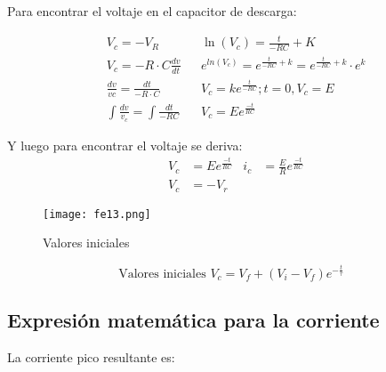 
Para encontrar el voltaje en el capacitor de descarga:

\begin{align*}
	 & V_{c}=-V_{R}                              &  & \ln (V_{c})= \frac{t}{-RC}+K                                     \\
	 & V_{c}=-R\cdot C \frac{dv}{dt}             &  & e^{ln(V_{c})}=e^{\frac{t}{-RC}+k}=e^{\frac{t}{-RC}+k}\cdot e^{k} \\
	 & \frac{dv}{vc}=\frac{dt}{-R\cdot C}        &  & V_{c}=ke^{\frac{t}{-RC}}; t=0, V_{c}=E                           \\
	 & \int \frac{dv}{v_{c}}=\int \frac{dt}{-RC} &  & V_{c}=Ee^{\frac{-t}{RC}}
\end{align*}

Y luego para encontrar el voltaje se deriva:
\begin{align*}
	 & V_{c} & =Ee^{\frac{-t}{RC}} & i_{c} & = \frac{E}{R} e^{\frac{-t}{RC}} \\
	 & V_{c} & =-V_{r}
\end{align*}

\begin{figure}[h!]
	\centerline{\texttt{[image: fe13.png]}}
	\caption{Valores iniciales}
	\label{fe13}
\end{figure}

\begin{equation}
	\text{Valores iniciales } V_{c}=V_{f}+\left( V_{i}-V_{f} \right) e^{- \frac{t}{\tau}}
\end{equation}

\subsection{Expresión matemática para la corriente}

La corriente pico resultante es:

